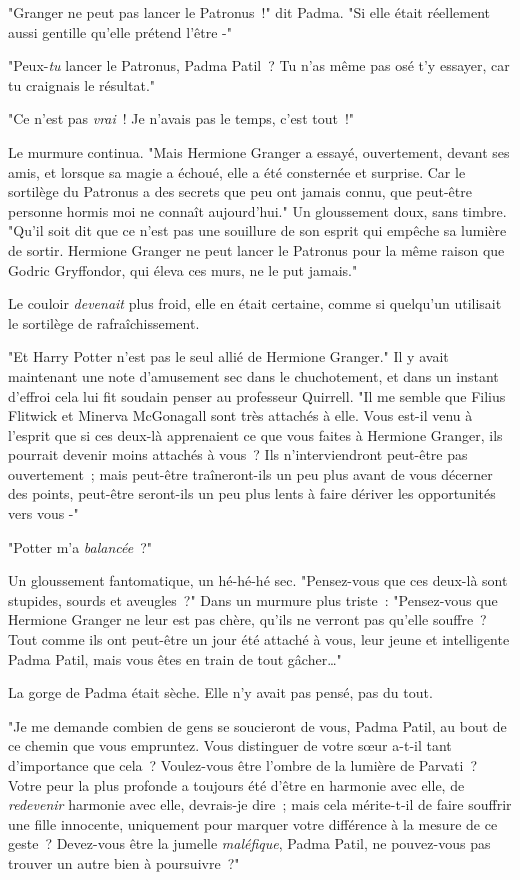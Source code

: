 "Granger ne peut pas lancer le Patronus~!" dit Padma. "Si elle était réellement aussi gentille qu'elle prétend l'être -"

"Peux-\emph{tu} lancer le Patronus, Padma Patil~? Tu n'as même pas osé t'y essayer, car tu craignais le résultat."

"Ce n'est pas \emph{vrai}~! Je n'avais pas le temps, c'est tout~!"

Le murmure continua. "Mais Hermione Granger a essayé, ouvertement, devant ses amis, et lorsque sa magie a échoué, elle a été consternée et surprise. Car le sortilège du Patronus a des secrets que peu ont jamais connu, que peut-être personne hormis moi ne connaît aujourd'hui." Un gloussement doux, sans timbre. "Qu'il soit dit que ce n'est pas une souillure de son esprit qui empêche sa lumière de sortir. Hermione Granger ne peut lancer le Patronus pour la même raison que Godric Gryffondor, qui éleva ces murs, ne le put jamais."

Le couloir \emph{devenait} plus froid, elle en était certaine, comme si quelqu'un utilisait le sortilège de rafraîchissement.

"Et Harry Potter n'est pas le seul allié de Hermione Granger." Il y avait maintenant une note d'amusement sec dans le chuchotement, et dans un instant d'effroi cela lui fit soudain penser au professeur Quirrell. "Il me semble que Filius Flitwick et Minerva McGonagall sont très attachés à elle. Vous est-il venu à l'esprit que si ces deux-là apprenaient ce que vous faites à Hermione Granger, ils pourrait devenir moins attachés à vous~? Ils n'interviendront peut-être pas ouvertement~; mais peut-être traîneront-ils un peu plus avant de vous décerner des points, peut-être seront-ils un peu plus lents à faire dériver les opportunités vers vous -"

"Potter m'a \emph{balancée}~?"

Un gloussement fantomatique, un hé-hé-hé sec. "Pensez-vous que ces deux-là sont stupides, sourds et aveugles~?" Dans un murmure plus triste~: "Pensez-vous que Hermione Granger ne leur est pas chère, qu'ils ne verront pas qu'elle souffre~? Tout comme ils ont peut-être un jour été attaché à vous, leur jeune et intelligente Padma Patil, mais vous êtes en train de tout gâcher…"

La gorge de Padma était sèche. Elle n'y avait pas pensé, pas du tout.

"Je me demande combien de gens se soucieront de vous, Padma Patil, au bout de ce chemin que vous empruntez. Vous distinguer de votre sœur a-t-il tant d'importance que cela~? Voulez-vous être l'ombre de la lumière de Parvati~? Votre peur la plus profonde a toujours été d'être en harmonie avec elle, de \emph{redevenir} harmonie avec elle, devrais-je dire~; mais cela mérite-t-il de faire souffrir une fille innocente, uniquement pour marquer votre différence à la mesure de ce geste~? Devez-vous être la jumelle \emph{maléfique}, Padma Patil, ne pouvez-vous pas trouver un autre bien à poursuivre~?"

